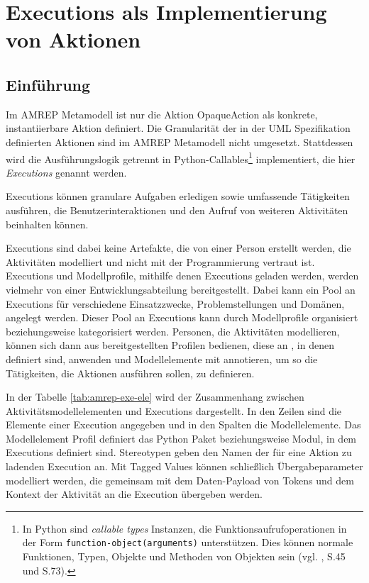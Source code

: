 \section{Executions als Implementierung von Aktionen}\label{amrep-executions}

\subsection{Einführung}

Im AMREP Metamodell ist nur die Aktion OpaqueAction als konkrete, instantiierbare Aktion definiert. Die Granularität der in der UML Spezifikation definierten Aktionen sind im AMREP Metamodell nicht umgesetzt. Stattdessen wird die Aus\-füh\-rungslogik getrennt in Python-Callables\footnote
{In Python sind \emph{callable types} Instanzen, die Funktionsaufrufoperationen in der Form \texttt{function-object(arguments)} unterstützen. Dies können normale Funktionen, Typen, Objekte und Methoden von Objekten sein (vgl. \citep{Martelli2006}, S.45 und S.73).}
implementiert, die hier \emph{Executions} genannt werden.

Executions können granulare Aufgaben erledigen sowie umfassende Tätigkeiten ausführen, die Benutzerinteraktionen und den Aufruf von weiteren Aktivitäten beinhalten können.

Executions sind dabei keine Artefakte, die von einer Person erstellt werden, die Aktivitäten modelliert und nicht mit der Programmierung vertraut ist. Executions und Modellprofile, mithilfe denen Executions geladen werden, werden vielmehr von einer Entwicklungsabteilung bereitgestellt. Dabei kann ein Pool an Executions für verschiedene Einsatzzwecke, Problemstellungen und Domänen, angelegt werden. Dieser Pool an Executions kann durch Modellprofile organisiert beziehungsweise kategorisiert werden. Personen, die Aktivitäten modellieren, können sich dann aus bereitgestellten Profilen bedienen, diese an , in denen  definiert sind, anwenden und Modellelemente mit  annotieren, um so die Tätigkeiten, die Aktionen ausführen sollen, zu definieren.

In der Tabelle \ref{tab:amrep-exe-ele} wird der Zusammenhang zwischen Aktivitätsmodellelementen und Executions dargestellt. In den Zeilen sind die Elemente einer Execution angegeben und in den Spalten die Modellelemente. Das Modellelement Profil definiert das Python Paket beziehungsweise Modul, in dem Executions definiert sind. Stereotypen geben den Namen der für eine Aktion zu ladenden Execution an. Mit Tagged Values können schließlich Übergabeparameter modelliert werden, die gemeinsam mit dem Daten-Payload von Tokens und dem Kontext der Aktivität an die Execution übergeben werden.

